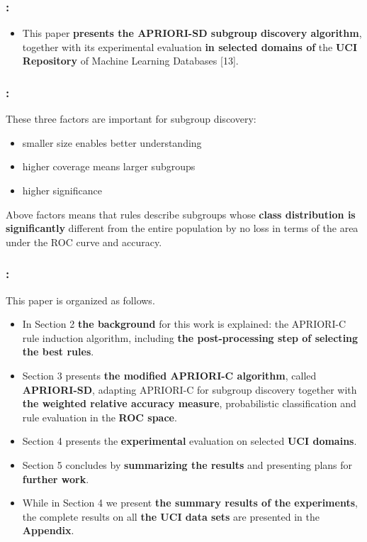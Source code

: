 \documentclass{beamer}
\begin{document}
\begin{CJK*}{UTF8}{bsmi}
\begin{frame}
\begin{itemize}
	\end{itemize}
\end{frame}
\begin{frame}
	\frametitle{\insertsection : \insertsubsection}
	\begin{itemize}
		\item This paper \textbf{presents the APRIORI-SD subgroup discovery algorithm}, together with its experimental evaluation\textbf{ in selected domains of} the \textbf{UCI Repository} of Machine Learning Databases [13].
	\end{itemize}
\end{frame}
\begin{frame}
	\frametitle{\insertsection : \insertsubsection}
	These three factors are important for subgroup discovery: 
	\begin{itemize}
		\item smaller size enables better understanding
		\item higher coverage means larger subgroups
		\item higher significance 
	\end{itemize}
	Above factors means that rules describe subgroups whose \textbf{class distribution is significantly }different from the entire population by no loss in terms of the area under the ROC curve and accuracy.
\end{frame}
\begin{frame}
	\frametitle{\insertsection : \insertsubsection}
	This paper is organized as follows.
	\begin{itemize}
		\item In Section 2 \textbf{the background} for this work is explained: the APRIORI-C rule induction algorithm, including \textbf{the post-processing step of selecting the best rules}.
		\item Section 3 presents \textbf{the modified APRIORI-C algorithm}, called \textbf{APRIORI-SD}, adapting APRIORI-C for subgroup discovery together with \textbf{the weighted relative accuracy measure}, probabilistic classification and rule evaluation in the \textbf{ROC space}.
		\item Section 4 presents the \textbf{experimental }evaluation on selected \textbf{UCI domains}.
		\item  Section 5 concludes by \textbf{summarizing the results} and presenting plans for \textbf{further work}.
		\item While in Section 4 we present \textbf{the summary results of the experiments}, the complete results on all \textbf{the UCI data sets} are presented in the\textbf{ Appendix}.
	\end{itemize}
\end{frame}

\end{CJK*}
\end{document}
